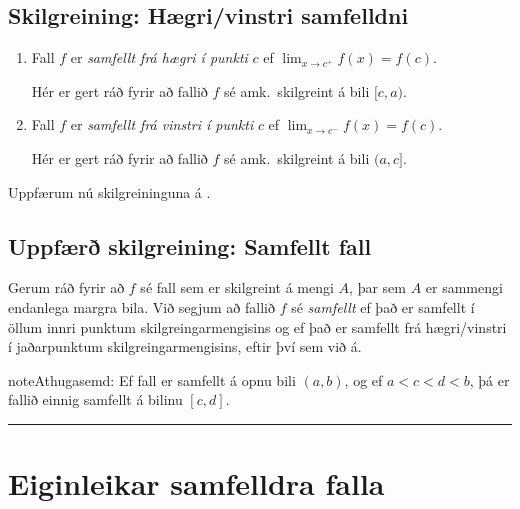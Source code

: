 \documentclass[b5paper,11pt,icelandic]{sphinxmanual}
\begin{document}
\subsection{Skilgreining: Hægri/vinstri samfelldni}
\label{kafli02:skilgreining-haegri-vinstri-samfelldni}\begin{enumerate}
\item {} 
Fall \(f\) er \emph{samfellt frá hægri í punkti} \(c\) ef
\(\lim_{x\rightarrow c^+}f(x)=f(c)\).

Hér er gert ráð fyrir að fallið \(f\) sé amk. skilgreint á
bili \([c, a)\).

\item {} 
Fall \(f\) er \emph{samfellt frá vinstri í punkti} \(c\) ef
\(\lim_{x\rightarrow c^-}f(x)=f(c)\).

Hér er gert ráð fyrir að fallið \(f\) sé amk. skilgreint á
bili \((a, c]\).

\end{enumerate}

Uppfærum nú skilgreininguna á {\hyperref[kafli02:skilgrsamfellt]{}}.


\subsection{Uppfærð skilgreining: Samfellt fall}
\label{kafli02:index-11}\label{kafli02:uppfaer-skilgreining-samfellt-fall}
Gerum ráð fyrir að \(f\) sé fall sem er skilgreint á mengi
\(A\), þar sem \(A\) er sammengi endanlega margra bila. Við
segjum að fallið \(f\) sé \emph{samfellt} ef það er samfellt í öllum
innri punktum skilgreingarmengisins og ef það er samfellt frá
hægri/vinstri í jaðarpunktum skilgreingarmengisins, eftir því sem við á.

\begin{notice}{note}{Athugasemd:}
Ef fall er samfellt á opnu bili \((a,b)\), og ef \(a<c<d<b\), þá
er fallið einnig samfellt á bilinu \([c,d]\).
\end{notice}


\bigskip\hrule{}\bigskip



\section{Eiginleikar samfelldra falla}
\label{kafli02:eiginleikar-samfelldra-falla}
\end{document}
